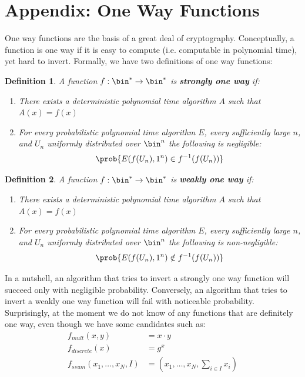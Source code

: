 \documentclass{article}
\newtheorem{definition}{Definition}
\begin{document}
\section{Appendix: One Way Functions}
\label{oneway}
One way functions are the basis of a great deal of cryptography.
Conceptually, a function is one way if it is easy to compute (i.e. computable in polynomial time), yet hard to invert.
Formally, we have two definitions of one way functions:
\begin{definition}
    A function $f: \bin^* \to \bin^*$ is \textbf{strongly one way} if:
    \begin{enumerate}
        \item There exists a deterministic polynomial time algorithm $A$ such that $A(x) = f(x)$
        \item For every probabilistic polynomial time algorithm $E$, every sufficiently large $n$, and $U_n$ uniformly distributed over $\bin^n$ the following is negligible:
              \[ \prob{E(f(U_n), 1^n) \in f^{-1}(f(U_n))  } \]
    \end{enumerate}
\end{definition}
\begin{definition}
    A function $f: \bin^* \to \bin^*$ is \textbf{weakly one way} if:
    \begin{enumerate}
        \item There exists a deterministic polynomial time algorithm $A$ such that $A(x) = f(x)$
        \item For every probabilistic polynomial time algorithm $E$, every sufficiently large $n$, and $U_n$ uniformly distributed over $\bin^n$ the following is non-negligible:
              \[ \prob{E(f(U_n), 1^n) \notin f^{-1}(f(U_n))  } \]
    \end{enumerate}
\end{definition}
In a nutshell, an algorithm that tries to invert a strongly one way function will succeed only with negligible probability.
Conversely, an algorithm that tries to invert a weakly one way function will fail with noticeable probability.
Surprisingly, at the moment we do not know of any functions that are definitely one way, even though we have some candidates such as:
\begin{align*}
    f_{mult}(x,y)                & =  x \cdot y                            \\
    f_{discrete}(x)              & = g^x                                   \\
    f_{ssum}(x_1, \dots, x_N, I) & = (x_1, \dots, x_N, \sum_{i \in I} x_i)
\end{align*}
\end{document}
